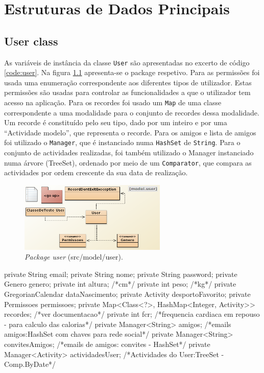 \documentclass[a4paper,10pt]{report}
\begin{document}
\chapter{Estruturas de Dados Principais}
\label{cap:estruturas}
\section{User class}
\label{sec:user}
As variáveis de instância da classe \verb!User! são apresentadas no excerto de código \ref{code:user}.
Na figura \ref{fig:user} apresenta-se o package respetivo.
Para as permissões foi usada uma enumeração correspondente aos diferentes tipos de utilizador. 
Estas permissões são usadas para controlar as funcionalidades a que o utilizador tem acesso na aplicação.
Para os recordes foi usado um \verb!Map! de uma classe correspondente a uma modalidade para o conjunto de recordes dessa modalidade. 
Um recorde é constituído pelo seu tipo, dado por um inteiro e por uma ``Actividade modelo'', que representa o recorde.
Para os amigos e lista de amigos foi utilizado o \verb!Manager!, que é instanciado numa \verb!HashSet! de \verb!String!.
Para o conjunto de actividades realizadas, foi também utilizado o Manager instanciado numa árvore (TreeSet), ordenado por meio 
de um \verb!Comparator!, que compara as actividades por ordem crescente da sua data de realização.

\begin{figure}
\centering
\includegraphics[width=7cm]{user.png}
\caption{\emph{Package user}  (src/model/user).}
\label{fig:user}
\end{figure}

\begin{code}[caption=Variáveis de instância da classe User (src/model/user)., label=code:user]
private String email;
private String nome;
private String password;
private Genero genero;
private int altura; /*cm*/
private int peso; /*kg*/
private GregorianCalendar dataNascimento;
private Activity desportoFavorito;
private Permissoes permissoes;
private Map<Class<?>, HashMap<Integer, Activity>>  recordes; /*ver documentacao*/
private int fcr; /*frequencia cardiaca em repouso - para calculo das calorias*/
private Manager<String> amigos; /*emails amigos:HashSet com chaves para rede social*/
private Manager<String> convitesAmigos; /*emails de amigos: convites - HashSet*/
private Manager<Activity> actividadesUser; /*Actividades do User:TreeSet -Comp.ByDate*/
\end{code}
\end{document}
